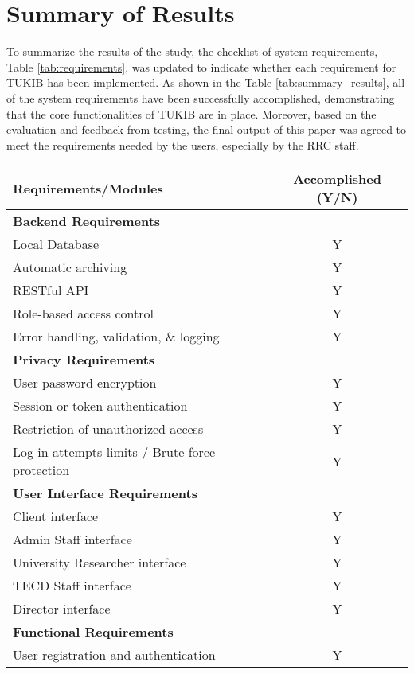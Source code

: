 \section{Summary of Results}

To summarize the results of the study, the checklist of system requirements, Table \ref{tab:requirements}, was updated to indicate whether each requirement for TUKIB has been implemented. As shown in the Table \ref{tab:summary_results}, all of the system requirements have been successfully accomplished, demonstrating that the core functionalities of TUKIB are in place. Moreover, based on the evaluation and feedback from testing, the final output of this paper was agreed to meet the requirements needed by the users, especially by the RRC staff.

\begin{table}[ht]
	\centering
	\begin{tabular}{|p{10cm}|c|}
		\hline
		\textbf{Requirements/Modules} & \textbf{Accomplished (Y/N)} \\
		\hline
		\multicolumn{2}{|l|}{\textbf{Backend Requirements}} \\
		\hline
		Local Database & Y \\
		Automatic archiving & Y \\
		RESTful API & Y \\
		Role-based access control & Y \\
		Error handling, validation, \& logging & Y \\
		\hline
		\multicolumn{2}{|l|}{\textbf{Privacy Requirements}} \\
		\hline
		User password encryption & Y \\
		Session or token authentication & Y \\
		Restriction of unauthorized access & Y \\
		Log in attempts limits / Brute-force protection & Y \\
		\hline
		\multicolumn{2}{|l|}{\textbf{User Interface Requirements}} \\
		\hline
		Client interface & Y \\
		Admin Staff interface & Y \\
		University Researcher interface & Y \\
		TECD Staff interface & Y \\
		Director interface & Y \\
		\hline
		\multicolumn{2}{|l|}{\textbf{Functional Requirements}} \\
		\hline
		User registration and authentication & Y \\

\end{tabular}
\end{table}
